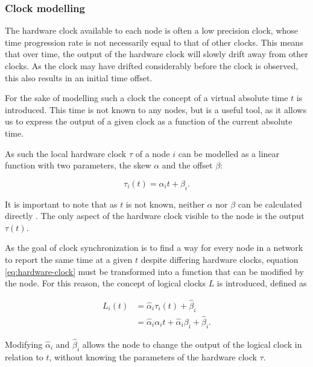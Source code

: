 \documentclass[a4paper,12pt]{article}
\begin{document}
\subsubsection{Clock modelling}

The hardware clock available to each node is often a low precision clock, whose time progression rate is not necessarily equal to that of other clocks. This means that over time, the output of the hardware clock will slowly drift away from other clocks. As the clock may have drifted considerably before the clock is observed, this also results in an initial time offset. \citep{LucaFiorentin11}

For the sake of modelling such a clock the concept of a virtual absolute time $t$ is introduced. This time is not known to any nodes, but is a useful tool, as it allows us to express the output of a given clock as a function of the current absolute time.

As such the local hardware clock $\tau$ of a node $i$ can be modelled as a linear function with two parameters, the skew $\alpha$ and the offset 
$\beta$:


\begin{equation}\label{eq:hardware-clock}
    \tau_i(t) = \alpha_i t + \beta_i.
\end{equation}

It is important to note that as $t$ is not known, neither $\alpha$ nor $\beta$ can be calculated directly \citep{LucaFiorentin11}. The only aspect of the hardware clock visible to the node is the output $\tau(t)$.

As the goal of clock synchronization is to find a way for every node in a network to report the same time at a given $t$ despite differing hardware clocks, equation \ref{eq:hardware-clock} must be transformed into a function that can be modified by the node. For this reason, the concept of logical clocks $L$ is introduced, defined as

\begin{align}
    L_i(t) &= \hat\alpha_i \tau_i(t) + \hat\beta_i \nonumber \\
        &= \hat\alpha_i \alpha_i t + \hat\alpha_i \beta_i + \hat\beta_i. \label{eq:logical-clock-expanded}
\end{align}

Modifying $\hat\alpha_i$ and $\hat\beta_i$ allows the node to change the output of the logical clock in relation to $t$, without knowing the parameters of the hardware clock $\tau$. \citep{LucaFiorentin11}
\end{document}
